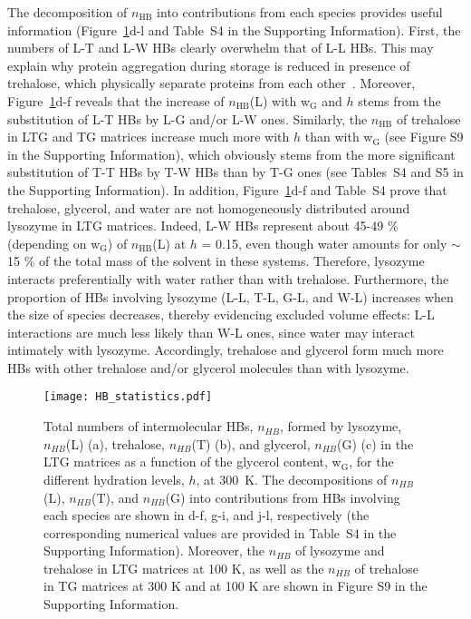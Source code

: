 \documentclass[journal=jpcbfk,manuscript=article]{achemso}
\begin{document}
\begin{singlespacing}
The decomposition of $n_{\textrm{HB}}$ into contributions from each species provides useful information 
(Figure~\ref{nb_HBs}d-l and Table~S4 in the Supporting Information). First, the numbers 
of L-T and L-W HBs clearly overwhelm that of L-L HBs. This may explain why protein aggregation during storage is
reduced in presence of trehalose, which physically separate proteins from each other~\cite{Wang2005,Perez2010}.
Moreover, Figure~\ref{nb_HBs}d-f reveals that the increase of $n_{\textrm{HB}}$(L) with w$_{\textrm{G}}$ and $h$ stems
from the substitution of L-T HBs by L-G and/or L-W ones. Similarly, the $n_{\textrm{HB}}$ of trehalose in LTG and TG
matrices increase much more with $h$ than with w$_{\textrm{G}}$ (see Figure S9 in the Supporting Information), 
which obviously stems from the more significant substitution of
T-T HBs by T-W HBs than by T-G ones (see Tables~S4 and S5 in the Supporting Information).
In addition, Figure~\ref{nb_HBs}d-f and Table~S4 prove 
that trehalose, glycerol, and water are not homogeneously distributed around lysozyme in LTG matrices. Indeed, 
L-W HBs represent about 45-49 \% (depending on w$_{\textrm{G}}$) of $n_{\textrm{HB}}$(L) at $h$ = 0.15, even though 
water amounts for only $\sim$ 15 \% of the total mass of the solvent in these systems. Therefore, lysozyme interacts 
preferentially with water rather than with trehalose. Furthermore, the proportion of HBs involving lysozyme 
(L-L, T-L, G-L, and W-L) increases when the size of species decreases, thereby evidencing excluded volume effects: 
L-L interactions are much less likely than W-L ones, since water may interact intimately with lysozyme.
Accordingly, trehalose and glycerol form much more HBs with other trehalose and/or glycerol molecules than with
lysozyme.

\begin{figure}[htbp]
\texttt{[image: HB\_statistics.pdf]}
\caption{\label{nb_HBs}
Total numbers of intermolecular HBs, $n_{HB}$, formed by lysozyme, $n_{HB}$(L) (a), trehalose, $n_{HB}$(T) (b), and 
glycerol, $n_{HB}$(G) (c) in the LTG matrices as a function of the glycerol content, w$_{\textrm{G}}$, for the different 
hydration levels, $h$, at 300~K. The decompositions of $n_{HB}$(L), $n_{HB}$(T), and $n_{HB}$(G)
into contributions from HBs involving each species are shown in d-f, g-i, and j-l, respectively (the corresponding
numerical values are provided in Table~S4 in the Supporting Information).
Moreover, the $n_{HB}$ of lysozyme and trehalose in LTG matrices at 100 K, as well as the $n_{HB}$ of trehalose in TG matrices
at 300 K and at 100 K are shown in Figure S9 in the Supporting Information.
}
\end{figure}



\end{singlespacing}
\end{document}
